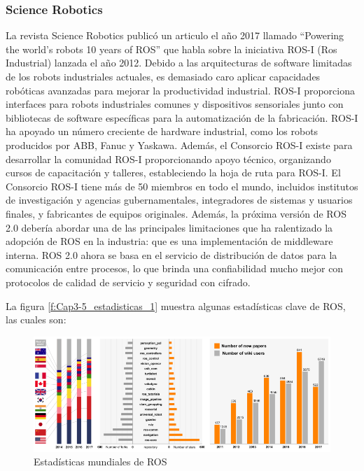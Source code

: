     \subsubsection{Science Robotics}
        La revista Science Robotics publicó un articulo el año 2017 llamado “Powering the world’s robots 10 years of ROS” \cite{Zhangeaar1868} que habla sobre la iniciativa ROS-I (Ros Industrial) lanzada el año 2012. Debido a las arquitecturas de software limitadas de los robots industriales actuales, es demasiado caro aplicar capacidades robóticas avanzadas para mejorar la productividad industrial. ROS-I proporciona interfaces para robots industriales comunes y dispositivos sensoriales junto con bibliotecas de software específicas para la automatización de la fabricación. ROS-I ha apoyado un número creciente de hardware industrial, como los robots producidos por ABB, Fanuc y Yaskawa. Además, el Consorcio ROS-I existe para desarrollar la comunidad ROS-I proporcionando apoyo técnico, organizando cursos de capacitación y talleres, estableciendo la hoja de ruta para ROS-I. El Consorcio ROS-I tiene más de 50 miembros en todo el mundo, incluidos institutos de investigación y agencias gubernamentales, integradores de sistemas y usuarios finales, y fabricantes de equipos originales. Además, la próxima versión de ROS 2.0 debería abordar una de las principales limitaciones que ha ralentizado la adopción de ROS en la industria: que es una implementación de middleware interna. ROS 2.0 ahora se basa en el servicio de distribución de datos para la comunicación entre procesos, lo que brinda una confiabilidad mucho mejor con protocolos de calidad de servicio y seguridad con cifrado.

        La figura \eqref{f:Cap3-5_estadisticas_1} muestra algunas estadísticas clave de ROS, las cuales son:

            \begin{figure}[htb]
                \centering
                \includegraphics[width=1.0\linewidth]{Main/Chapter3/Images3/science_robot_esta_1.png}
                \caption{Estadísticas mundiales de ROS \cite{Zhangeaar1868}}
                \label{f:Cap3-5_estadisticas_1}
            \end{figure}        

